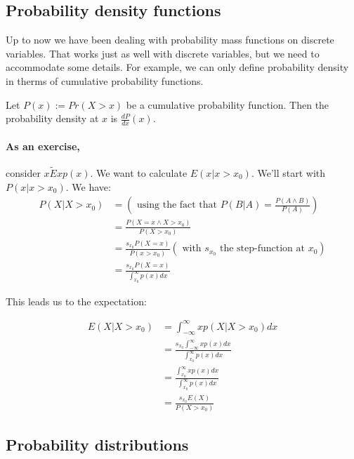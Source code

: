  
\subsection{Probability density functions}
Up to now we have been dealing with probability mass functions on discrete variables.
That works just as well with discrete variables, but we need to accommodate some details.
For example, we can only define probability density in therms of cumulative probability functions.

Let $P(x) := Pr(X > x)$ be a cumulative probability function.
Then the probability density at $x$ is $\frac{d P}{d x}(x)$.

\paragraph{As an exercise,} consider $x \tilde Exp(x)$. We want to calculate $E(x | x > x_0)$. 
We'll start with $P(x | x > x_0)$.
We have:
\begin{equation}
    \begin{aligned}
        P(X | X > x_0) &= \left( \text{ using the fact that } P(B|A) = \frac{P(A \land B)}{P(A)} \right) \\
                          &= \frac{ P(X = x \land X > x_0) }{ P(X > x_0) } \\
                          &= \frac{ s_{x_0} P(X=x) }{ P(x > x_0) }  (\text{ with $s_{x_0}$ the step-function at $x_0$}) \\
                          &= \frac{ s_{x_0} P(X=x) }{ \int_{x_0}^\infty p(x) dx }
    \end{aligned}
\end{equation}

This leads us to the expectation:

\begin{equation}
    \begin{aligned}
        E(X | X > x_0)  &= \int_{-\infty}^\infty x p(X | X > x_0) dx \\
                        &= \frac{ s_{x_0} \int_{-\infty}^\infty x p(x) dx }{ \int_{x_0}^\infty p(x) dx } \\
                        &= \frac{ \int_{x_0}^\infty x p(x) dx }{ \int_{x_0}^\infty p(x) dx } \\
                        &= \frac{ s_{x_0} E(X) }{ P(X > x_0) } 
    \end{aligned}
\end{equation}


\subsection{Probability distributions}

